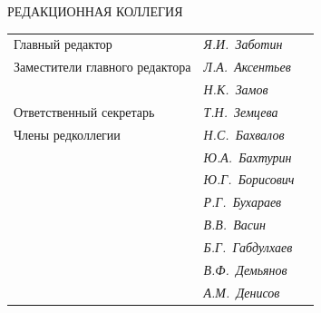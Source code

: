 




\pagestyle{empty}





\bigskip


\bigskip


\centerline{\Large РЕДАКЦИОННАЯ КОЛЛЕГИЯ}


\bigskip


\bigskip


\begin{tabular}{p{63mm}p{40mm}p{50mm}}


Главный редактор               &   \it Я.И.~Заботин & \\


Заместители главного редактора &   \it Л.А.~Аксентьев  & \\


                               &   \it Н.К.~Замов  & \\


Ответственный секретарь        &   \it Т.Н.~Земцева & \\[3mm]


Члены редколлегии              &   \it Н.С.~Бахвалов & \\


                               &   \it Ю.А.~Бахтурин  & \\


                               &   \it Ю.Г.~Борисович & \\


                               &   \it Р.Г.~Бухараев & \\


                               &   \it В.В.~Васин  & \\


                               &   \it Б.Г.~Габдулхаев & \\


                               &   \it В.Ф.~Демьянов & \\


                               &   \it А.М.~Денисов & \\



\end{tabular}
